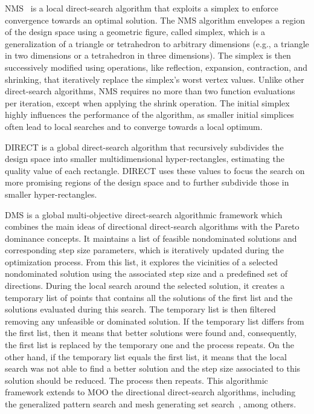 	NMS~\cite{Nelder1964} is a local direct-search algorithm that exploits a simplex to enforce convergence towards an optimal solution. The NMS algorithm envelopes a region of the design space using a geometric figure, called simplex, which is a generalization of a triangle or tetrahedron to arbitrary dimensions (e.g., a triangle in two dimensions or a tetrahedron in three dimensions). The simplex is then successively modified using operations, like reflection, expansion, contraction, and shrinking, that iteratively replace the simplex's worst vertex values. Unlike other direct-search algorithms, NMS requires no more than two function evaluations per iteration, except when applying the shrink operation. The initial simplex highly influences the performance of the algorithm, as smaller initial simplices often lead to local searches and to converge towards a local optimum.
	
	DIRECT \cite{Jones1993DIRECT} is a global direct-search algorithm that recursively subdivides the design space into smaller multidimensional hyper-rectangles, estimating the quality value of each rectangle. DIRECT uses these values to focus the search on more promising regions of the design space and to further subdivide those in smaller hyper-rectangles. 
	
	DMS \cite{Custodio2010} is a global multi-objective direct-search algorithmic framework which combines the main ideas of directional direct-search algorithms with the Pareto dominance concepts. It maintains a list of feasible nondominated solutions and corresponding step size parameters, which is iteratively updated during the optimization process. From this list, it explores the vicinities of a selected nondominated solution using the associated step size and a predefined set of directions. During the local search around the selected solution, it creates a temporary list of points that contains all the solutions of the first list and the solutions evaluated during this search. The temporary list is then filtered removing any unfeasible or dominated solution. If the temporary list differs from the first list, then it means that better solutions were found and, consequently, the first list is replaced by the temporary one and the process repeats.  On the other hand, if the temporary list equals the first list, it means that the local search was not able to find a better solution and the step size associated to this solution should be reduced. The process then repeats. This algorithmic framework extends to \ac{MOO} the directional direct-search algorithms, including the generalized pattern search and mesh generating set search~\cite{Kolda2003}, among others. 
	
